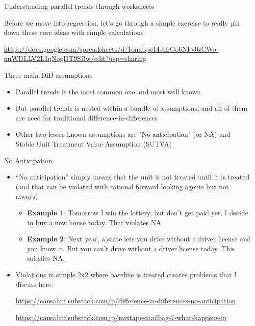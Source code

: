 \documentclass{beamer}
\begin{document}
\begin{frame}{Understanding parallel trends through worksheets}

Before we move into regression, let's go through a simple exercise to really pin down these core ideas with simple calculations

\bigskip 

\url{https://docs.google.com/spreadsheets/d/1onabpc14JdrGo6NFv0zCWo-nuWDLLV2L1qNogDT9SBw/edit?usp=sharing}

\end{frame}


\begin{frame}{Three main DiD assumptions}

\begin{itemize}
\item Parallel trends is the most common one and most well known
\item But parallel trends is nested within a bundle of assumptions, and all of them are need for traditional difference-in-differences
\item Other two lesser known assumptions are "No anticipation" (or NA) and Stable Unit Treatment Value Assumption (SUTVA)

\end{itemize}

\end{frame}


\begin{frame}{No Anticipation}

\begin{itemize}
\item ``No anticipation'' simply means that the unit is not treated until it is treated (and that can be violated with rational forward looking agents but not always)
	\begin{itemize}
	\item \textbf{Example 1}: Tomorrow I win the lottery, but don't get paid yet. I decide to buy a new house today. That violates NA
	\item \textbf{Example 2}: Next year, a state lets you drive without a driver license and you know it. But you can't drive without a driver license today.  This satisfies NA.
	\end{itemize}
\item Violations in simple 2x2 where baseline is treated creates problems that I discuss here: \bigskip

 \url{https://causalinf.substack.com/p/difference-in-differences-no-anticipation}
 
 \bigskip
 
 \url{https://causalinf.substack.com/p/mixtape-mailbag-7-what-happens-in}
\end{itemize}

\end{frame}
\end{document}
